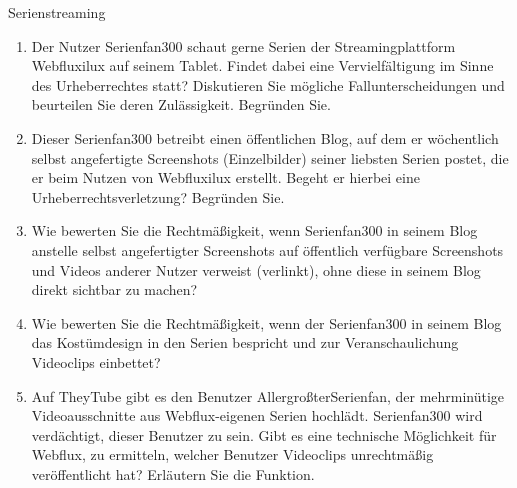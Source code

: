 \documentclass{article}
\begin{document}
\begin{exercise}{Serienstreaming}
  \begin{enumerate}
    \item Der Nutzer Serienfan300 schaut gerne Serien der Streamingplattform Webfluxilux auf seinem Tablet. Findet dabei eine Vervielfältigung im Sinne des Urheberrechtes statt? Diskutieren Sie mögliche Fallunterscheidungen und beurteilen Sie deren Zulässigkeit. Begründen Sie.
    \item Dieser Serienfan300 betreibt einen öffentlichen Blog, auf dem er wöchentlich selbst angefertigte Screenshots (Einzelbilder) seiner liebsten Serien postet, die er beim Nutzen von Webfluxilux erstellt. Begeht er hierbei eine Urheberrechtsverletzung? Begründen Sie.
    \item Wie bewerten Sie die Rechtmäßigkeit, wenn Serienfan300 in seinem Blog anstelle selbst angefertigter Screenshots auf öffentlich verfügbare Screenshots und Videos anderer Nutzer verweist (verlinkt), ohne diese in seinem Blog direkt sichtbar zu machen?
    \item Wie bewerten Sie die Rechtmäßigkeit, wenn der Serienfan300 in seinem Blog das Kostümdesign in den Serien bespricht und zur Veranschaulichung Videoclips einbettet?
    \item Auf TheyTube gibt es den Benutzer AllergroßterSerienfan, der mehrminütige Videoausschnitte aus Webflux-eigenen Serien hochlädt. Serienfan300 wird verdächtigt, dieser Benutzer zu sein. Gibt es eine technische Möglichkeit für Webflux, zu ermitteln, welcher Benutzer Videoclips unrechtmäßig veröffentlicht hat? Erläutern Sie die Funktion.
  \end{enumerate}


\end{exercise}
\end{document}
